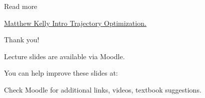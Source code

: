\documentclass{beamer}
\begin{document}
\begin{frame}{Read more}
	\begin{flushleft}
		
		
\textcolor{blue}{\href{http://www.matthewpeterkelly.com/research/MatthewKelly_IntroTrajectoryOptimization_SIAM_Review_2017.pdf}{Matthew Kelly Intro Trajectory Optimization.}}


\end{flushleft}
\end{frame}


\begin{frame}{Thank you!}
\centerline{Lecture slides are available via Moodle.}
\bigskip
\centerline{You can help improve these slides at:}
\centerline{\mygit}
\bigskip
\centerline{Check Moodle for additional links, videos, textbook suggestions.}
\bigskip

\centerline{\textcolor{black}{}}

\end{frame}
\end{document}
